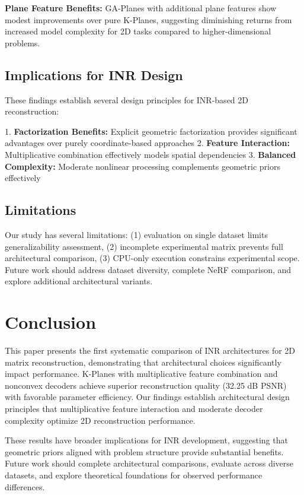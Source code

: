\documentclass{article}
\begin{document}
\textbf{Plane Feature Benefits:} GA-Planes with additional plane features show modest improvements over pure K-Planes, suggesting diminishing returns from increased model complexity for 2D tasks compared to higher-dimensional problems.

\subsection{Implications for INR Design}

These findings establish several design principles for INR-based 2D reconstruction:

1. \textbf{Factorization Benefits:} Explicit geometric factorization provides significant advantages over purely coordinate-based approaches
2. \textbf{Feature Interaction:} Multiplicative combination effectively models spatial dependencies
3. \textbf{Balanced Complexity:} Moderate nonlinear processing complements geometric priors effectively

\subsection{Limitations}

Our study has several limitations: (1) evaluation on single dataset limits generalizability assessment, (2) incomplete experimental matrix prevents full architectural comparison, (3) CPU-only execution constrains experimental scope. Future work should address dataset diversity, complete NeRF comparison, and explore additional architectural variants.

\section{Conclusion}

This paper presents the first systematic comparison of INR architectures for 2D matrix reconstruction, demonstrating that architectural choices significantly impact performance. K-Planes with multiplicative feature combination and nonconvex decoders achieve superior reconstruction quality (32.25 dB PSNR) with favorable parameter efficiency. Our findings establish architectural design principles that multiplicative feature interaction and moderate decoder complexity optimize 2D reconstruction performance.

These results have broader implications for INR development, suggesting that geometric priors aligned with problem structure provide substantial benefits. Future work should complete architectural comparisons, evaluate across diverse datasets, and explore theoretical foundations for observed performance differences.
\end{document}

